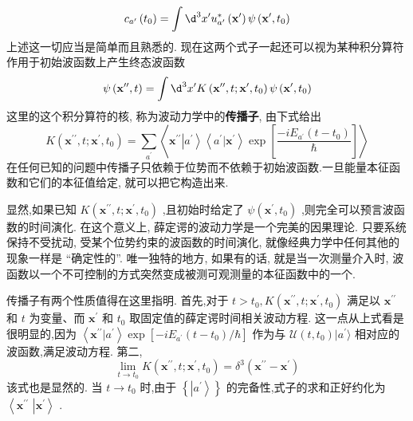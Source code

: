 \documentclass[lang=cn,newtx,10pt,scheme=chinese,thmcnt=section]{elegantbook}
\begin{document}
\begin{equation}
	{c}_{{a}^{\prime }}\left( {t}_{0}\right) = \int {\d}^{3}{x}^{\prime }{u}_{{a}^{\prime }}^{ * }\left( {\mathbf{x}}^{\prime }\right) \psi \left( {{\mathbf{x}}^{\prime },{t}_{0}}\right)
\end{equation}
上述这一切应当是简单而且熟悉的. 现在这两个式子一起还可以视为某种积分算符作用于初始波函数上产生终态波函数
\begin{equation}
	\psi \left( {{\mathbf{x}}^{\prime \prime }, t}\right) = \int {\d}^{3}{x}^{\prime }K\left( {{\mathbf{x}}^{\prime \prime }, t;{\mathbf{x}}^{\prime },{t}_{0}}\right) \psi \left( {{\mathbf{x}}^{\prime },{t}_{0}}\right)
\end{equation}
这里的这个积分算符的核, 称为波动力学中的\textbf{传播子}, 由下式给出
\begin{equation}
	K\left( {{\mathbf{x}}^{\prime \prime }, t;{\mathbf{x}}^{\prime },{t}_{0}}\right) = \mathop{\sum }\limits_{{a}^{\prime }}\left\langle {{\mathbf{x}}^{\prime \prime }\left| {a}^{\prime }\right\rangle \left\langle {{a}^{\prime } | {\mathbf{x}}^{\prime }}\right\rangle \exp \left\lbrack \frac{-i{E}_{{a}^{\prime }}\left( {t - {t}_{0}}\right) }{\hbar }\right\rbrack }\right\rangle
\end{equation}
在任何已知的问题中传播子只依赖于位势而不依赖于初始波函数.一旦能量本征函数和它们的本征值给定, 就可以把它构造出来.

显然,如果已知 $K\left( {{\mathbf{x}}^{\prime \prime }, t;{\mathbf{x}}^{\prime },{t}_{0}}\right)$ ,且初始时给定了 $\psi \left( {{\mathbf{x}}^{\prime },{t}_{0}}\right)$ ,则完全可以预言波函数的时间演化. 在这个意义上, 薛定谔的波动力学是一个完美的因果理论. 只要系统保持不受扰动, 受某个位势约束的波函数的时间演化, 就像经典力学中任何其他的现象一样是 “确定性的”. 唯一独特的地方, 如果有的话, 就是当一次测量介入时, 波函数以一个不可控制的方式突然变成被测可观测量的本征函数中的一个.

传播子有两个性质值得在这里指明. 首先,对于 $t > {t}_{0}, K\left( {{\mathbf{x}}^{\prime \prime }, t;{\mathbf{x}}^{\prime },{t}_{0}}\right)$ 满足以 ${\mathbf{x}}^{\prime \prime }$ 和 $t$ 为变量、而 ${\mathbf{x}}^{\prime }$ 和 ${t}_{0}$ 取固定值的薛定谔时间相关波动方程. 这一点从上式看是很明显的,因为 $\left\langle {{\mathbf{x}}^{\prime \prime } | {a}^{\prime }}\right\rangle \exp \left\lbrack {-i{E}_{{a}^{\prime }}\left( {t - {t}_{0}}\right) /\hbar }\right\rbrack$ 作为与 $\mathcal{U}\left( {t,{t}_{0}}\right) | {a}^{\prime }\rangle$ 相对应的波函数,满足波动方程. 第二,
\begin{equation}
	\mathop{\lim }\limits_{{t \rightarrow {t}_{0}}}K\left( {{\mathbf{x}}^{\prime \prime }, t;{\mathbf{x}}^{\prime },{t}_{0}}\right) = {\delta }^{3}\left( {{\mathbf{x}}^{\prime \prime } - {\mathbf{x}}^{\prime }}\right)
\end{equation}
该式也是显然的. 当 $t \rightarrow {t}_{0}$ 时,由于 $\left\{ \left| {a}^{\prime }\right\rangle \right\}$ 的完备性,式子的求和正好约化为 $\left\langle {\mathbf{x}}^{\prime \prime }\right.$ $\left| {\mathbf{x}}^{\prime }\right\rangle$ .
\end{document}
